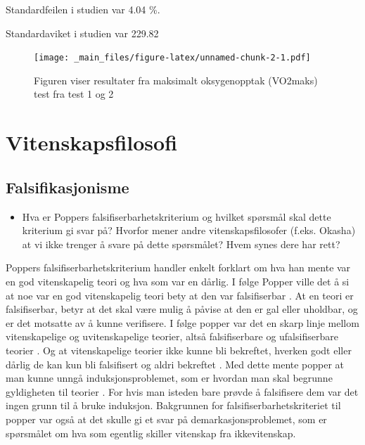 \documentclass[
]{book}
\providecommand{\tightlist}{%
  \setlength{\itemsep}{0pt}\setlength{\parskip}{0pt}}
\begin{document}
Standardfeilen i studien var 4.04 \%.

Standardaviket i studien var 229.82

\begin{figure}
\centering
\texttt{[image: \_main\_files/figure-latex/unnamed-chunk-2-1.pdf]}
\caption{\label{fig:unnamed-chunk-2}Figuren viser resultater fra maksimalt oksygenopptak (VO2maks) test fra test 1 og 2}
\end{figure}

\hypertarget{vitenskapsfilosofi}{%
\chapter{Vitenskapsfilosofi}\label{vitenskapsfilosofi}}

\hypertarget{falsifikasjonisme}{%
\section{Falsifikasjonisme}\label{falsifikasjonisme}}

\begin{itemize}
\tightlist
\item
  Hva er Poppers falsifiserbarhetskriterium og hvilket spørsmål skal dette kriterium gi svar på?
  Hvorfor mener andre vitenskapsfilosofer (f.eks. Okasha) at vi ikke trenger å svare på dette spørsmålet?
  Hvem synes dere har rett?
\end{itemize}

Poppers falsifiserbarhetskriterium handler enkelt forklart om hva han mente var en god vitenskapelig teori og hva som var en dårlig.
I følge Popper ville det å si at noe var en god vitenskapelig teori bety at den var falsifiserbar \citet{okasha2016}.
At en teori er falsifiserbar, betyr at det skal være mulig å påvise at den er gal eller uholdbar, og er det motsatte av å kunne verifisere.
I følge popper var det en skarp linje mellom vitenskapelige og uvitenskapelige teorier, altså falsifiserbare og ufalsifiserbare teorier \citet{okasha2016}.
Og at vitenskapelige teorier ikke kunne bli bekreftet, hverken godt eller dårlig de kan kun bli falsifisert og aldri bekreftet \citet{okasha2016}.
Med dette mente popper at man kunne unngå induksjonsproblemet, som er hvordan man skal begrunne gyldigheten til teorier \citet{okasha2016}.
For hvis man isteden bare prøvde å falsifisere dem var det ingen grunn til å bruke induksjon.
Bakgrunnen for falsifiserbarhetskriteriet til popper var også at det skulle gi et svar på demarkasjonsproblemet, som er spørsmålet om hva som egentlig skiller vitenskap fra ikkevitenskap.
\end{document}
